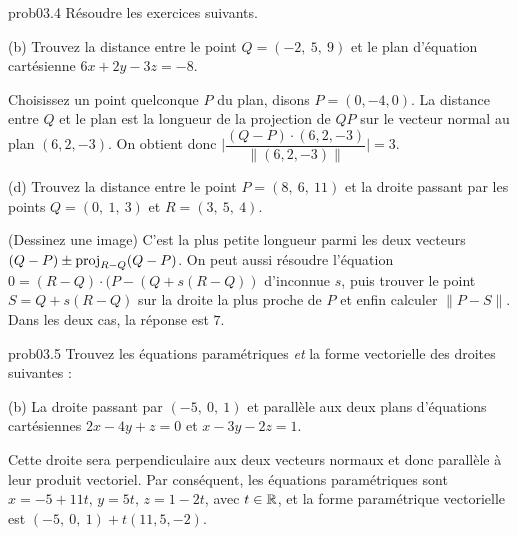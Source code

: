 \bigskip
\begin{sol}{prob03.4}  Résoudre les exercices suivants.  \medskip



(b) Trouvez la distance entre le point $Q=(-2,\ 5,\ 9)$ et le plan d'équation cartésienne
$6x+2y-3z=-8$.

\soln Choisissez un point quelconque $P$ du plan, disons $P=(0,-4,0)$. La distance entre $Q$ et le plan est la longueur de la projection de $QP$ sur le vecteur normal au plan $(6,2,-3)$. On obtient donc $\Big|\dfrac{(Q-P)\cdot(6,2,-3)}{\|(6,2,-3)\|}\Big|=3.$ \medskip

\medskip


(d) Trouvez la distance entre le point $P=(8,\ 6,\ 11)$ et la droite passant par les points $Q=(0,\ 1,\ 3)$ et $R=(3,\ 5,\ 4)$. 


\soln (Dessinez une image)  C'est la plus petite longueur parmi les deux vecteurs $(Q-P)\pm \operatorname{proj}_{R-Q}(Q-P)$. On peut aussi résoudre l'\'equation $0=(R-Q)\cdot(P-(Q+ s (R-Q))$ d'inconnue $s$, puis trouver le point $S=Q+ s (R-Q)$ sur la droite la plus proche de $P$ et enfin calculer $\|P-S \|$. Dans les deux cas, la réponse est $7$. \medskip





\end{sol} 

\bigskip
\begin{sol}{prob03.5}   Trouvez les \'equations paramétriques {\it et} la forme vectorielle des droites suivantes :
\medskip


(b) La droite passant par $(-5,\ 0,\ 1)$ et parallèle aux deux plans d'équations cartésiennes $2x-4y+z=0$ et $x-3y-2z=1$. 
\medskip

\soln Cette droite sera perpendiculaire aux deux vecteurs normaux et donc parallèle à leur produit vectoriel. Par conséquent, les \'equations paramétriques sont $x=-5+11t,\, y=5t,\, z=1-2t$, avec $t\in \mathbb{R}$, et la forme paramétrique vectorielle est $(-5,\ 0,\ 1) + t(11,5,-2)$.\medskip

\end{sol} 


